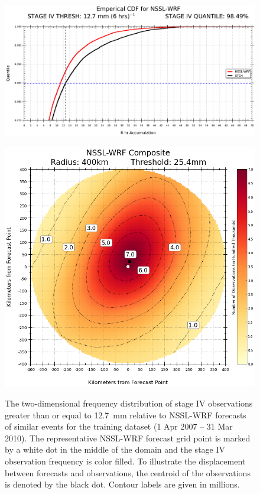 \begin{figure}[cc]
    \centering
    \includegraphics[width=\textwidth,height=\textheight,keepaspectratio]{
    ./deterministic/figs/ecdf-nsslwrf-12mm.pdf}\\
    \caption{}
    \label{nssl_12quant}
\end{figure}


\clearpage
\begin{figure}[cc]
    \centering
    \includegraphics[width=\textwidth,height=\textheight,keepaspectratio]{
    ./deterministic/figs/single_member_composite_400km_25-4mm.png}\\
    \caption{The two-dimensional frequency distribution of stage IV observations greater than or equal to \mbox{12.7 mm} relative to NSSL-WRF forecasts of similar events for the training dataset (1 Apr 2007 -- 31 Mar 2010).
    The representative NSSL-WRF forecast grid point is marked by a white dot in the middle of the domain and the stage IV observation frequency is color filled.
    To illustrate the displacement between forecasts and observations, the centroid of the observations is denoted by the black dot.
    Contour labels are given in millions.}
    \label{single_25thresh}
\end{figure}


